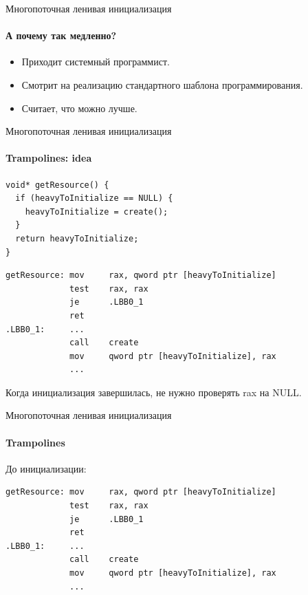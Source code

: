 \begin{frame}{Многопоточная ленивая инициализация}
\framesubtitle{А почему так медленно?}

\begin{itemize}

\item Приходит системный программист.

\pause

\item Смотрит на реализацию стандартного шаблона программирования.

\pause

\item Считает, что можно лучше.
\end{itemize}

\end{frame}


\begin{frame}[fragile]{Многопоточная ленивая инициализация}
\framesubtitle{Trampolines: idea}

\begin{verbatim}
void* getResource() {
  if (heavyToInitialize == NULL) {
    heavyToInitialize = create();
  }
  return heavyToInitialize;
}
\end{verbatim}

\pause

\begin{verbatim}
getResource: mov     rax, qword ptr [heavyToInitialize]
             test    rax, rax
             je      .LBB0_1
             ret
.LBB0_1:     ...
             call    create
             mov     qword ptr [heavyToInitialize], rax
             ...
\end{verbatim}

\pause

Когда инициализация завершилась, не нужно проверять rax на NULL.

\end{frame}


\begin{frame}[fragile]{Многопоточная ленивая инициализация}
\framesubtitle{Trampolines}

До инициализации:
\begin{verbatim}
getResource: mov     rax, qword ptr [heavyToInitialize]
             test    rax, rax
             je      .LBB0_1
             ret
.LBB0_1:     ...
             call    create
             mov     qword ptr [heavyToInitialize], rax
             ...
\end{verbatim}
\end{frame}


